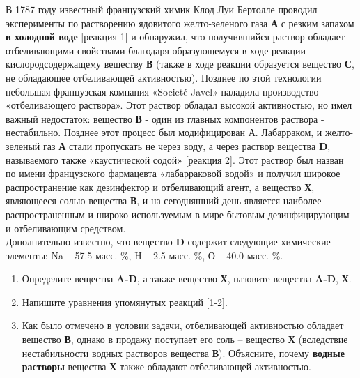 
В 1787 году известный французский химик Клод Луи Бертолле проводил эксперименты по растворению ядовитого желто-зеленого газа \textbf{А} с резким запахом \textbf{в холодной воде} [реакция 1] и обнаружил, что получившийся раствор обладает отбеливающими свойствами благодаря образующемуся в ходе реакции кислородсодержащему веществу \textbf{В} (также в ходе реакции образуется вещество \textbf{С}, не обладающее отбеливающей активностью). Позднее по этой технологии небольшая французская компания «Societé Javel» наладила производство «отбеливающего раствора». Этот раствор обладал высокой активностью, но имел важный недостаток: вещество \textbf{В} - один из главных компонентов раствора - нестабильно. Позднее этот процесс был модифицирован А. Лабарраком, и желто-зеленый газ \textbf{А} стали пропускать не через воду, а через раствор вещества \textbf{D}, называемого также «каустической содой» [реакция 2]. Этот раствор был назван по имени французского фармацевта «лабарраковой водой» и получил широкое распространение как дезинфектор и отбеливающий агент, а вещество \textbf{Х}, являющееся солью вещества \textbf{В}, и на сегодняшний день является наиболее распространенным и широко используемым в мире бытовым дезинфицирующим и отбеливающим средством.\\
Дополнительно известно, что вещество \textbf{D} содержит следующие химические элементы: Na – 57.5 масс. \%, H – 2.5 масс. \%, О – 40.0 масс. \%.

\begin{enumerate}
\item Определите вещества \textbf{A-D}, а также вещество \textbf{Х}, назовите вещества \textbf{A-D}, \textbf{Х}.
\item Напишите уравнения упомянутых реакций [1-2].
\item Как было отмечено в условии задачи, отбеливающей активностью обладает вещество \textbf{В}, однако в продажу поступает его соль – вещество \textbf{Х} (вследствие нестабильности водных растворов вещества \textbf{В}). Объясните, почему \textbf{водные растворы} вещества \textbf{Х} также обладают отбеливающей активностью.
\end{enumerate}